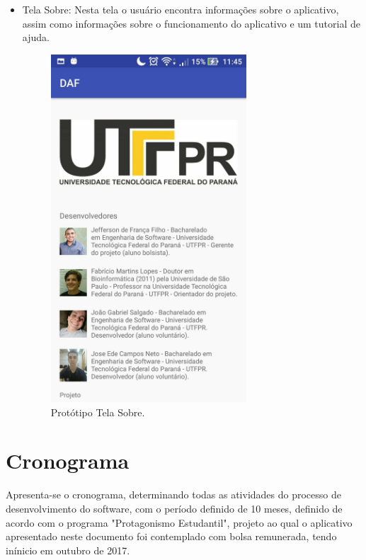 \begin{itemize}
	\item  Tela Sobre: Nesta tela o usu\'ario encontra informa\c{c}\~oes sobre o aplicativo, assim como informa\c{c}\~oes sobre o funcionamento do aplicativo e um tutorial de ajuda. 
	\begin{figure}[H]
		\centering
		\caption[Prot\'otipo Tela Sobre]{Prot\'otipo Tela Sobre. \label{fig:prototiposobre}}
		\includegraphics[height=13cm]{./Figuras/prototipo_sobre.jpg}%
	\end{figure}
\end{itemize}

\section{Cronograma}

Apresenta-se o cronograma, determinando todas as atividades do processo de desenvolvimento do software, com o per\'iodo definido de 10 meses, definido de acordo com o programa "Protagonismo Estudantil", projeto ao qual o aplicativo apresentado neste documento foi contemplado com bolsa remunerada, tendo in\'inicio em outubro de 2017. 

